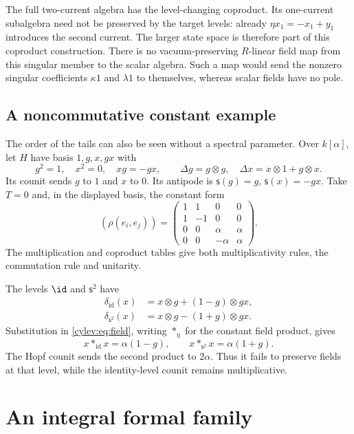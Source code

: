 The full two-current algebra has the level-changing coproduct.
Its one-current subalgebra need not be preserved by the target levels:
already $\eta x_1=-x_1+y_1$ introduces the second current.
The larger state space is therefore part of this coproduct construction.
There is no vacuum-preserving $R$-linear field map from this singular
member to the scalar algebra. Such a map would send the nonzero
singular coefficients $\kappa1$ and $\lambda1$ to themselves,
whereas scalar fields have no pole.

\subsection{A noncommutative constant example}

The order of the tails can also be seen without a spectral parameter.
Over $k[\alpha]$, let $H$ have basis $1,g,x,gx$ with
\[
 g^2=1,\quad x^2=0,\quad xg=-gx,\qquad
 \Delta g=g\otimes g,\quad \Delta x=x\otimes1+g\otimes x.
\]
Its counit sends $g$ to $1$ and $x$ to $0$. Its antipode is
$\mathsf s(g)=g$, $\mathsf s(x)=-gx$.
Take $T=0$ and, in the displayed basis, the constant form
\begin{equation}\label{cylev:eq:sweedler-form}
 (\rho(e_i,e_j))=
 \begin{pmatrix}
 1&1&0&0\\1&-1&0&0\\0&0&\alpha&\alpha\\0&0&-\alpha&\alpha
 \end{pmatrix}.
\end{equation}
The multiplication and coproduct tables give both multiplicativity
rules, the commutation rule and unitarity.

The levels $\id$ and $\mathsf s^2$ have
\begin{align*}
 \delta_{\mathrm{id}}(x)&=x\otimes g+(1-g)\otimes gx,\\
 \delta_{\mathsf s^2}(x)&=x\otimes g-(1+g)\otimes gx.
\end{align*}
Substitution in \eqref{cylev:eq:field}, writing $*_{\eta}$ for the
constant field product, gives
\[
 x*_{\mathrm{id}}x=\alpha(1-g),\qquad
 x*_{\mathsf s^2}x=\alpha(1+g).
\]
The Hopf counit sends the second product to $2\alpha$.
Thus it fails to preserve fields at that level, while the identity-level
counit remains multiplicative.

\section{An integral formal family}

